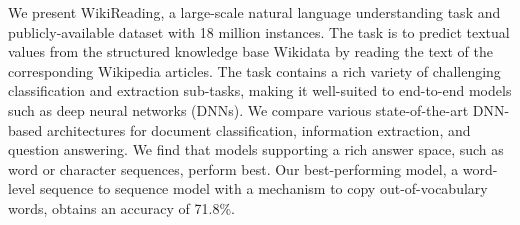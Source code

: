 We present WikiReading, a large-scale natural language understanding task and publicly-available dataset with 18 million instances. The task is to predict textual values from the structured knowledge base Wikidata by reading the text of the corresponding Wikipedia articles. The task contains a rich variety of challenging classification and extraction sub-tasks, making it well-suited to end-to-end models such as deep neural networks (DNNs). We compare various state-of-the-art DNN-based architectures for document classification, information extraction, and question answering. We find that models supporting a rich answer space, such as word or character sequences, perform best. Our best-performing model, a word-level sequence to sequence model with a mechanism to copy out-of-vocabulary words, obtains an accuracy of 71.8\%.

